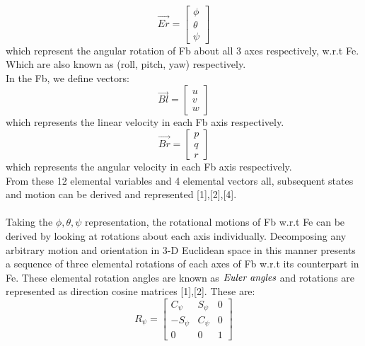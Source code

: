 \documentclass[12pt,a4paper,twoside]{report}
\begin{document}
			\\
			\begin{equation}
			\vec{Er} = 
			\begin{bmatrix}
				\phi \\
				\theta \\
				\psi
			\end{bmatrix}
			\end{equation}
			which represent the angular rotation of Fb about all 3 axes respectively, w.r.t Fe. Which are also known as (roll, pitch, yaw) respectively.
			\\
			In the Fb, we define vectors:
			\\
			\begin{equation}
			\vec{Bl} = 
			\begin{bmatrix}
				u \\
				v \\
				w
			\end{bmatrix}
			\end{equation}
			which represents the linear velocity in each Fb axis respectively.
			\\
			\begin{equation}
			\vec{Br} = 
			\begin{bmatrix}
				p \\
				q \\
				r
			\end{bmatrix}
			\end{equation}
			which represents the angular velocity in each Fb axis respectively.
			\\
			From these 12 elemental variables and 4 elemental vectors all, subsequent states and motion can be derived and represented [1],[2],[4].
			\\ \\
			Taking the \(\phi, \theta, \psi\) representation, the rotational motions of Fb w.r.t Fe can be derived by looking at rotations about each axis individually. Decomposing any arbitrary motion and orientation in 3-D Euclidean space in this manner presents a sequence of three elemental rotations of each axes of Fb w.r.t its counterpart in Fe. These elemental rotation angles are known as $\emph{Euler angles}$  and rotations are represented as direction cosine matrices [1],[2]. These are:
			\\
			\begin{equation}
			R_\psi = 
			\begin{bmatrix}
				C_\psi & S_\psi & 0  \\
				-S_\psi & C_\psi & 0  \\
				0 & 0 & 1
			\end{bmatrix}
			\end{equation}
\end{document}
